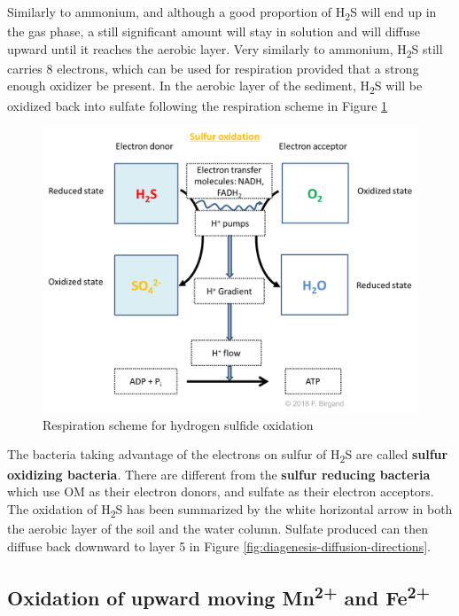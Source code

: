 \documentclass[]{book}
\theoremstyle{definition}
\theoremstyle{definition}
\theoremstyle{definition}
\theoremstyle{remark}
\begin{document}
Similarly to ammonium, and although a good proportion of
H\textsubscript{2}S will end up in the gas phase, a still significant
amount will stay in solution and will diffuse upward until it reaches
the aerobic layer. Very similarly to ammonium, H\textsubscript{2}S still
carries 8 electrons, which can be used for respiration provided that a
strong enough oxidizer be present. In the aerobic layer of the sediment,
H\textsubscript{2}S will be oxidized back into sulfate following the
respiration scheme in Figure \ref{fig:respiration-H2S-O2}

\begin{figure}

{\centering \includegraphics[width=0.75\linewidth]{pictures/respiration-H2S-O2} 

}

\caption{Respiration scheme for hydrogen sulfide oxidation}\label{fig:respiration-H2S-O2}
\end{figure}

The bacteria taking advantage of the electrons on sulfur of
H\textsubscript{2}S are called \textbf{sulfur oxidizing bacteria}. There
are different from the \textbf{sulfur reducing bacteria} which use OM as
their electron donors, and sulfate as their electron acceptors. The
oxidation of H\textsubscript{2}S has been summarized by the white
horizontal arrow in both the aerobic layer of the soil and the water
column. Sulfate produced can then diffuse back downward to layer 5 in
Figure \ref{fig:diagenesis-diffusion-directions}.

\subsection{\texorpdfstring{Oxidation of upward moving
Mn\textsuperscript{2+} and
Fe\textsuperscript{2+}}{Oxidation of upward moving Mn2+ and Fe2+}}\label{oxidation-of-upward-moving-mn2-and-fe2}
\end{document}
